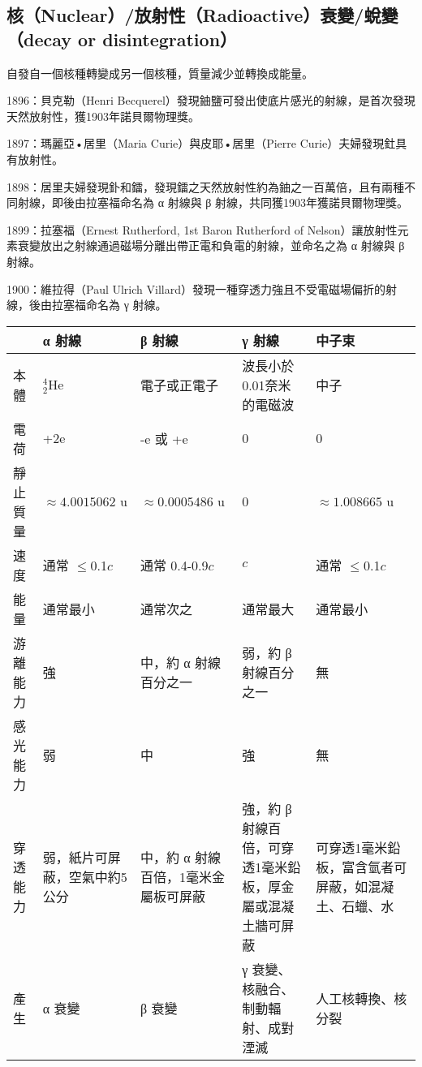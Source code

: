 \documentclass[a4paper,12pt]{article}
\begin{document}
\subsection{核（Nuclear）/放射性（Radioactive）衰變/蛻變（decay or disintegration）}
自發自一個核種轉變成另一個核種，質量減少並轉換成能量。
\bit
\item 1896：貝克勒（Henri Becquerel）發現鈾鹽可發出使底片感光的射線，是首次發現天然放射性，獲1903年諾貝爾物理獎。
\item 1897：瑪麗亞•居里（Maria Curie）與皮耶•居里（Pierre Curie）夫婦發現釷具有放射性。
\item 1898：居里夫婦發現釙和鐳，發現鐳之天然放射性約為鈾之一百萬倍，且有兩種不同射線，即後由拉塞福命名為 α 射線與 β 射線，共同獲1903年獲諾貝爾物理獎。
\item 1899：拉塞福（Ernest Rutherford, 1st Baron Rutherford of Nelson）讓放射性元素衰變放出之射線通過磁場分離出帶正電和負電的射線，並命名之為 α 射線與 β 射線。
\item 1900：維拉得（Paul Ulrich Villard）發現一種穿透力強且不受電磁場偏折的射線，後由拉塞福命名為 γ 射線。
\eit
{}
\begin{longtable}[c]{|p{}|p{}|p{}|p{}|p{}|}
\hline
&  α 射線 &  β 射線 & γ 射線 & 中子束 \\\hline\endhead
本體 & $^4_2$He & 電子或正電子 & 波長小於0.01奈米的電磁波 & 中子 \\\hline
電荷 & +2e & -e 或 +e & 0 & 0 \\\hline
靜止質量 & $\approx4.0015062$ u & $\approx0.0005486$ u & 0 & $\approx1.008665$ u \\\hline
速度 & 通常 $\leq$0.1$c$ & 通常 0.4-0.9$c$ & $c$ & 通常 $\leq$0.1$c$ \\\hline
能量 & 通常最小 & 通常次之 & 通常最大 & 通常最小\\\hline
游離能力 & 強 & 中，約 α 射線百分之一 & 弱，約 β 射線百分之一 & 無\\\hline
感光能力 & 弱 & 中 & 強 & 無 \\\hline
穿透能力 & 弱，紙片可屏蔽，空氣中約5公分 & 中，約 α 射線百倍，1毫米金屬板可屏蔽 & 強，約 β 射線百倍，可穿透1毫米鉛板，厚金屬或混凝土牆可屏蔽 & 可穿透1毫米鉛板，富含氫者可屏蔽，如混凝土、石蠟、水 \\\hline
產生 & α 衰變 & β 衰變 & γ 衰變、核融合、制動輻射、成對湮滅 & 人工核轉換、核分裂 \\\hline
\end{longtable}\FloatBarrier
\end{document}
